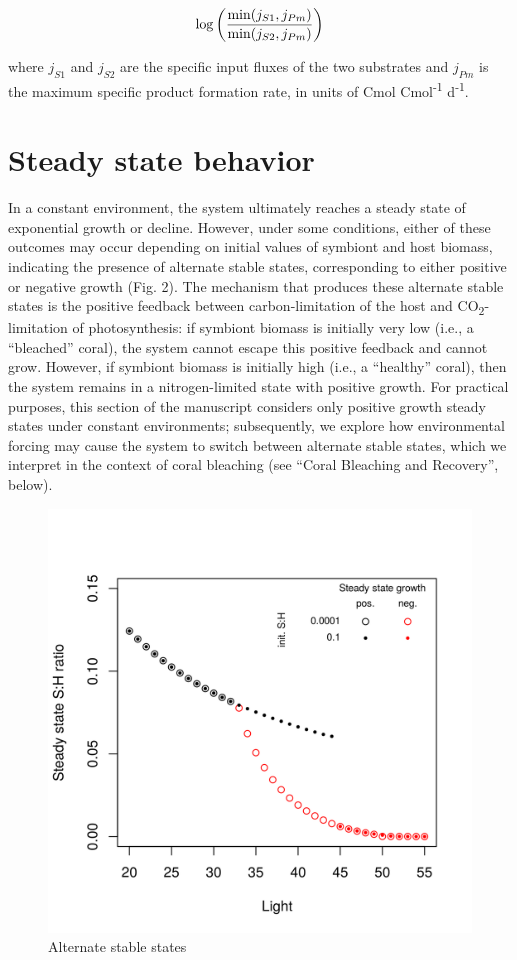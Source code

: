 \documentclass[]{elsarticle} %
\makeatletter
\def\maxwidth{\ifdim\Gin@nat@width>\linewidth\linewidth
\else\Gin@nat@width\fi}
\let\Oldincludegraphics\includegraphics
\renewcommand{\includegraphics}[1]{\Oldincludegraphics[width=\maxwidth]{#1}}
\makeatother
\begin{document}
\begin{equation} \log \bigg({{\min(j_{S1}, j_{Pm})} \over {\min(j_{S2}, j_{Pm})}}\bigg) \end{equation}

where \(j_{S1}\) and \(j_{S2}\) are the specific input fluxes of the two
substrates and \(j_{Pm}\) is the maximum specific product formation
rate, in units of Cmol Cmol\textsuperscript{-1} d\textsuperscript{-1}.

\section{Steady state behavior}\label{steady-state-behavior}

In a constant environment, the system ultimately reaches a steady state
of exponential growth or decline. However, under some conditions, either
of these outcomes may occur depending on initial values of symbiont and
host biomass, indicating the presence of alternate stable states,
corresponding to either positive or negative growth (Fig. 2). The
mechanism that produces these alternate stable states is the positive
feedback between carbon-limitation of the host and
CO\textsubscript{2}-limitation of photosynthesis: if symbiont biomass is
initially very low (i.e., a ``bleached'' coral), the system cannot
escape this positive feedback and cannot grow. However, if symbiont
biomass is initially high (i.e., a ``healthy'' coral), then the system
remains in a nitrogen-limited state with positive growth. For practical
purposes, this section of the manuscript considers only positive growth
steady states under constant environments; subsequently, we explore how
environmental forcing may cause the system to switch between alternate
stable states, which we interpret in the context of coral bleaching (see
``Coral Bleaching and Recovery'', below).

\begin{figure}[htbp]
\centering
\includegraphics{../img/Fig2.png}
\caption{Alternate stable states}
\end{figure}
\end{document}
